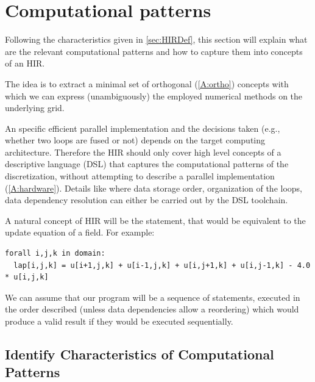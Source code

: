 \documentclass[a4paper,10pt]{scrartcl}
\begin{document}
\section{Computational patterns}
\label{sec:comppatterns}

Following the characteristics given in \cref{sec:HIRDef}, this section will explain 
what are the relevant computational patterns and how to capture them into concepts of an HIR.

The idea is to extract a minimal set of orthogonal (\ref{A:ortho}) concepts with which we can express (unambiguously) the employed numerical methods on the underlying grid.

An specific efficient parallel implementation and the decisions taken (e.g., whether two loops are fused or not)
depends on the target computing architecture. Therefore the HIR should only cover high level concepts of a
descriptive language (DSL) that captures the computational patterns of the discretization, without attempting
to describe a parallel implementation (\ref{A:hardware}).
Details like where data storage order, organization of the loops, data dependency resolution can
either be carried out by the DSL toolchain.

A natural concept of HIR will be the statement, that would be equivalent to the update equation of a field. For example:
\begin{lstlisting}
forall i,j,k in domain:
  lap[i,j,k] = u[i+1,j,k] + u[i-1,j,k] + u[i,j+1,k] + u[i,j-1,k] - 4.0 * u[i,j,k]
\end{lstlisting}

\begin{longfbox}[rounded]
We can assume that our program will be a sequence of statements, executed in the order described (unless data
dependencies allow a reordering) which would produce a valid result if they would be executed sequentially.
\end{longfbox}

\subsection{Identify Characteristics of Computational Patterns}
\label{sec:idPattern}
\end{document}
